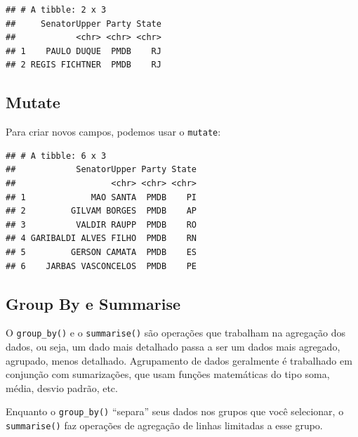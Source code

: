 \documentclass[]{book}
\newenvironment{Shaded}{\begin{snugshade}}{\end{snugshade}}
\newcommand{\KeywordTok}[1]{\textcolor[rgb]{0.13,0.29,0.53}{\textbf{#1}}}
\newcommand{\StringTok}[1]{\textcolor[rgb]{0.31,0.60,0.02}{#1}}
\newcommand{\CommentTok}[1]{\textcolor[rgb]{0.56,0.35,0.01}{\textit{#1}}}
\newcommand{\OperatorTok}[1]{\textcolor[rgb]{0.81,0.36,0.00}{\textbf{#1}}}
\newcommand{\NormalTok}[1]{#1}
\begin{document}
\begin{verbatim}
## # A tibble: 2 x 3
##     SenatorUpper Party State
##            <chr> <chr> <chr>
## 1    PAULO DUQUE  PMDB    RJ
## 2 REGIS FICHTNER  PMDB    RJ
\end{verbatim}

\subsection{Mutate}\label{mutate}

Para criar novos campos, podemos usar o \texttt{mutate}:

\begin{Shaded}
\end{Shaded}

\begin{verbatim}
## # A tibble: 6 x 3
##            SenatorUpper Party State
##                   <chr> <chr> <chr>
## 1             MAO SANTA  PMDB    PI
## 2         GILVAM BORGES  PMDB    AP
## 3          VALDIR RAUPP  PMDB    RO
## 4 GARIBALDI ALVES FILHO  PMDB    RN
## 5         GERSON CAMATA  PMDB    ES
## 6    JARBAS VASCONCELOS  PMDB    PE
\end{verbatim}

\subsection{Group By e Summarise}\label{group-by-e-summarise}

O \texttt{group\_by()} e o \texttt{summarise()} são operações que
trabalham na agregação dos dados, ou seja, um dado mais detalhado passa
a ser um dados mais agregado, agrupado, menos detalhado. Agrupamento de
dados geralmente é trabalhado em conjunção com sumarizações, que usam
funções matemáticas do tipo soma, média, desvio padrão, etc.

Enquanto o \texttt{group\_by()} ``separa'' seus dados nos grupos que
você selecionar, o \texttt{summarise()} faz operações de agregação de
linhas limitadas a esse grupo.
\end{document}
